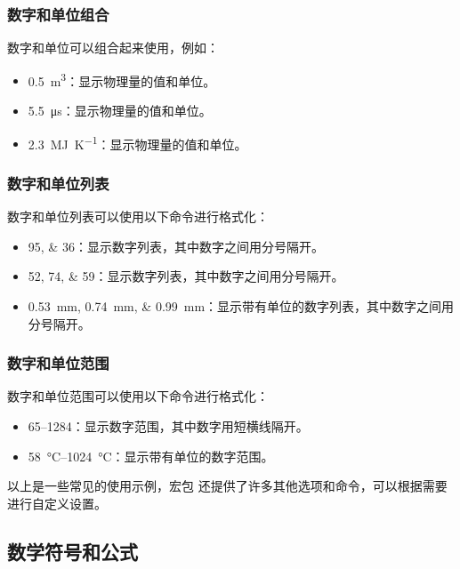 \subsubsection{数字和单位组合}

数字和单位可以组合起来使用，例如：

\begin{itemize}
\item \SI{0.5}{\metre\cubed}：显示物理量的值和单位。
\item \SI{5.5}{\micro\second}：显示物理量的值和单位。
\item \SI{2.3}{\mega\joule\per\kelvin}：显示物理量的值和单位。
\end{itemize}

\subsubsection{数字和单位列表}

数字和单位列表可以使用以下命令进行格式化：

\begin{itemize}
\item \numlist{95;36}：显示数字列表，其中数字之间用分号隔开。
\item \numlist{52;74;59}：显示数字列表，其中数字之间用分号隔开。
\item \SIlist{0.53;0.74;0.99}{\milli\metre}：显示带有单位的数字列表，其中数字之间用分号隔开。
\end{itemize}

\subsubsection{数字和单位范围}

数字和单位范围可以使用以下命令进行格式化：

\begin{itemize}
\item \numrange{65}{1284}：显示数字范围，其中数字用短横线隔开。
\item \SIrange{58}{1024}{\degreeCelsius}：显示带有单位的数字范围。
\end{itemize}

以上是一些常见的使用示例，宏包  还提供了许多其他选项和命令，可以根据需要进行自定义设置。

\subsection{数学符号和公式}

